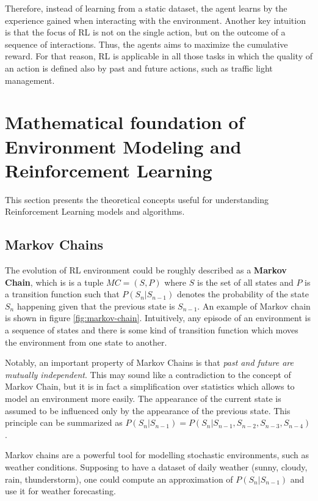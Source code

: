 Therefore, instead of learning from a static dataset, the agent learns by the experience gained when interacting with the environment.
Another key intuition is that the focus of RL is not on the single action, but on the outcome of a sequence of interactions. Thus, the agents aims to maximize the cumulative reward.
For that reason, RL is applicable in all those tasks in which the quality of an action is defined also by past and future actions, such as traffic light management.

\section{Mathematical foundation of Environment Modeling and Reinforcement Learning}

This section presents the theoretical concepts useful for understanding Reinforcement Learning models and algorithms.

\subsection{Markov Chains}

The evolution of RL environment could be roughly described as a \textbf{Markov Chain}, which is is a tuple $MC = (S, P)$ where $S$ is the set of all states and $P$ is a transition function such that $P(S_n | S_{n-1})$ denotes the probability of the state $S_n$ happening given that the previous state is $S_{n-1}$. An example of Markov chain is shown in figure \ref{fig:markov-chain}. Intuitively, any episode of an environment is a sequence of states and there is some kind of transition function which moves the environment from one state to another.

Notably, an important property of Markov Chains is that \textit{past and future are mutually independent}. This may sound like a contradiction to the concept of Markov Chain, but it is in fact a simplification over statistics which allows to model an environment more easily. The appearance of the current state is assumed to be influenced only by the appearance of the previous state. This principle can be summarized as $P(S_n | S_{n-1}) = P(S_n | S_{n-1}, S_{n-2}, S_{n-3}, S_{n-4})$.

Markov chains are a powerful tool for modelling stochastic environments, such as weather conditions. Supposing to have a dataset of daily weather (sunny, cloudy, rain, thunderstorm), one could compute an approximation of $P(S_n | S_{n-1})$ and use it for weather forecasting.

